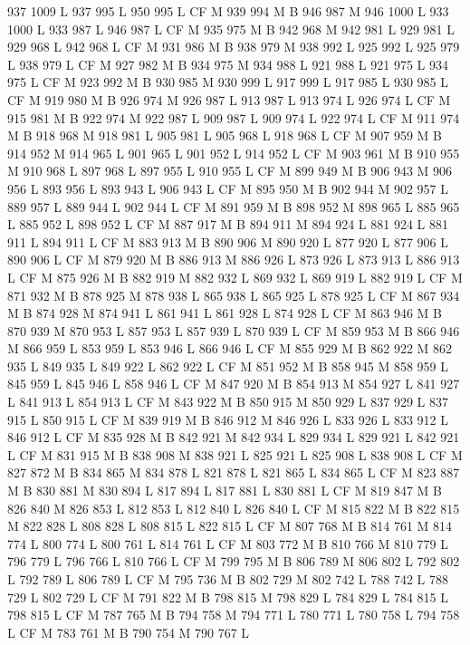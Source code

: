 {{{{{{{{{{{{{{{{{{{{{{{{{{{937 1009 L
937 995 L
950 995 L
CF M
939 994 M B
946 987 M 946 1000 L
933 1000 L
933 987 L
946 987 L
CF M
935 975 M B
942 968 M 942 981 L
929 981 L
929 968 L
942 968 L
CF M
931 986 M B
938 979 M 938 992 L
925 992 L
925 979 L
938 979 L
CF M
927 982 M B
934 975 M 934 988 L
921 988 L
921 975 L
934 975 L
CF M
923 992 M B
930 985 M 930 999 L
917 999 L
917 985 L
930 985 L
CF M
919 980 M B
926 974 M 926 987 L
913 987 L
913 974 L
926 974 L
CF M
915 981 M B
922 974 M 922 987 L
909 987 L
909 974 L
922 974 L
CF M
911 974 M B
918 968 M 918 981 L
905 981 L
905 968 L
918 968 L
CF M
907 959 M B
914 952 M 914 965 L
901 965 L
901 952 L
914 952 L
CF M
903 961 M B
910 955 M 910 968 L
897 968 L
897 955 L
910 955 L
CF M
899 949 M B
906 943 M 906 956 L
893 956 L
893 943 L
906 943 L
CF M
895 950 M B
902 944 M 902 957 L
889 957 L
889 944 L
902 944 L
CF M
891 959 M B
898 952 M 898 965 L
885 965 L
885 952 L
898 952 L
CF M
887 917 M B
894 911 M 894 924 L
881 924 L
881 911 L
894 911 L
CF M
883 913 M B
890 906 M 890 920 L
877 920 L
877 906 L
890 906 L
CF M
879 920 M B
886 913 M 886 926 L
873 926 L
873 913 L
886 913 L
CF M
875 926 M B
882 919 M 882 932 L
869 932 L
869 919 L
882 919 L
CF M
871 932 M B
878 925 M 878 938 L
865 938 L
865 925 L
878 925 L
CF M
867 934 M B
874 928 M 874 941 L
861 941 L
861 928 L
874 928 L
CF M
863 946 M B
870 939 M 870 953 L
857 953 L
857 939 L
870 939 L
CF M
859 953 M B
866 946 M 866 959 L
853 959 L
853 946 L
866 946 L
CF M
855 929 M B
862 922 M 862 935 L
849 935 L
849 922 L
862 922 L
CF M
851 952 M B
858 945 M 858 959 L
845 959 L
845 946 L
858 946 L
CF M
847 920 M B
854 913 M 854 927 L
841 927 L
841 913 L
854 913 L
CF M
843 922 M B
850 915 M 850 929 L
837 929 L
837 915 L
850 915 L
CF M
839 919 M B
846 912 M 846 926 L
833 926 L
833 912 L
846 912 L
CF M
835 928 M B
842 921 M 842 934 L
829 934 L
829 921 L
842 921 L
CF M
831 915 M B
838 908 M 838 921 L
825 921 L
825 908 L
838 908 L
CF M
827 872 M B
834 865 M 834 878 L
821 878 L
821 865 L
834 865 L
CF M
823 887 M B
830 881 M 830 894 L
817 894 L
817 881 L
830 881 L
CF M
819 847 M B
826 840 M 826 853 L
812 853 L
812 840 L
826 840 L
CF M
815 822 M B
822 815 M 822 828 L
808 828 L
808 815 L
822 815 L
CF M
807 768 M B
814 761 M 814 774 L
800 774 L
800 761 L
814 761 L
CF M
803 772 M B
810 766 M 810 779 L
796 779 L
796 766 L
810 766 L
CF M
799 795 M B
806 789 M 806 802 L
792 802 L
792 789 L
806 789 L
CF M
795 736 M B
802 729 M 802 742 L
788 742 L
788 729 L
802 729 L
CF M
791 822 M B
798 815 M 798 829 L
784 829 L
784 815 L
798 815 L
CF M
787 765 M B
794 758 M 794 771 L
780 771 L
780 758 L
794 758 L
CF M
783 761 M B
790 754 M 790 767 L
}}}}}}}}}}}}}}}}}}}}}}}}}}}
